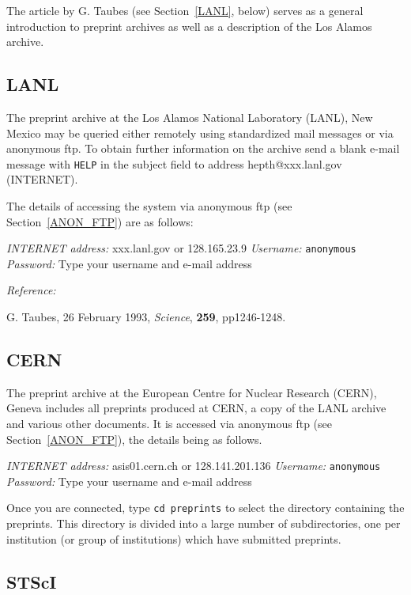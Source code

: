 \documentclass[twoside,11pt,nolof]{starlink}
\begin{document}
The article by G. Taubes (see Section~\ref{LANL}, below) serves as a
general introduction to preprint archives as well as a description of
the Los Alamos archive.

\subsection{LANL
\label{LANL}}

The preprint archive at the Los Alamos National Laboratory (LANL), New
Mexico may be queried either remotely using standardized mail messages
or via anonymous ftp. To obtain further information on the archive send
a blank e-mail message with \texttt{HELP} in the subject field to address
hepth@xxx.lanl.gov (INTERNET).

The details of accessing the system via anonymous ftp (see
Section~\ref{ANON_FTP}) are as follows:

\textit{INTERNET address: } xxx.lanl.gov or 128.165.23.9
\newline \textit{Username:} \verb-anonymous-
\newline \textit{Password:} Type your username and e-mail address

\textit{Reference:}

G. Taubes, 26 February 1993, \textit{Science}, \textbf{259}, pp1246-1248.

\subsection{CERN}

The preprint archive at the European Centre for Nuclear Research (CERN),
Geneva includes all preprints produced at CERN, a copy of the LANL
archive and various other documents. It is accessed via anonymous ftp
(see Section~\ref{ANON_FTP}), the details being as follows.

\textit{INTERNET address: } asis01.cern.ch or 128.141.201.136
\newline \textit{Username:} \verb-anonymous-
\newline \textit{Password:} Type your username and e-mail address

Once you are connected, type \texttt{cd preprints} to select the directory
containing the preprints. This directory is divided into a large number
of subdirectories, one per institution (or group of institutions) which
have submitted preprints.

\subsection{STScI
\label{STSCI}}
\end{document}
